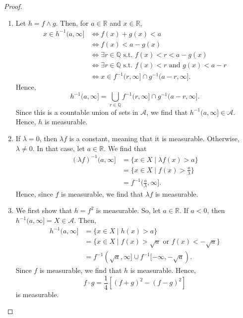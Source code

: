 \documentclass[a4paper, openany]{memoir}
\theoremstyle{definition}
\theoremstyle{plain}
\begin{document}
    \begin{proof}
        \hspace*{0pt}
        \begin{enumerate}
            \item Let $h = f \land g$. Then, for $a \in \mathbb{R}$ and $x \in \mathbb{R}$,
            \begin{align*}
                x \in h^{-1}(a, \infty] &\iff f(x) + g(x) < a \\
                &\iff f(x) < a - g(x) \\
                &\iff \exists r \in \mathbb{Q} \textrm{ s.t. } f(x) < r < a - g(x) \\
                &\iff \exists r \in \mathbb{Q} \textrm{ s.t. } f(x) < r \textrm{ and } g(x) < a - r \\
                &\iff x \in f^{-1} (r, \infty] \cap g^{-1} (a - r, \infty].
            \end{align*}
            Hence,
            \[h^{-1}(a, \infty] = \bigcup_{r \in \mathbb{Q}} f^{-1} (r, \infty] \cap g^{-1} (a - r, \infty].\]
            Since this is a countable union of sets in $\mathcal{A}$, we find that $h^{-1}(a, \infty] \in \mathcal{A}$. Hence, $h$ is measurable.
            
            \item If $\lambda = 0$, then $\lambda f$ is a constant, meaning that it is measurable. Otherwise, $\lambda \neq 0$. In that case, let $a \in \mathbb{R}$. We find that
            \begin{align*}
                (\lambda f)^{-1} (a, \infty] &= \{x \in X \mid \lambda f(x) > a\} \\
                &= \{x \in X \mid f(x) > \tfrac{a}{\lambda}\} \\
                &= f^{-1} (\tfrac{a}{\lambda}, \infty].
            \end{align*}
            Hence, since $f$ is measurable, we find that $\lambda f$ is measurable.

            \item We first show that $h = f^2$ is measurable. So, let $a \in \mathbb{R}$. If $a < 0$, then $h^{-1}(a, \infty] = X \in \mathcal{A}$. Then,
            \begin{align*}
                h^{-1}(a, \infty] &= \{x \in X \mid h(x) > a\} \\
                &= \{x \in X \mid f(x) > \sqrt{a} \textrm{ or } f(x) < -\sqrt{a}\} \\
                &= f^{-1}(\sqrt{a}, \infty] \cup f^{-1} [-\infty, -\sqrt{a}).
            \end{align*}
            Since $f$ is measurable, we find that $h$ is measurable. Hence,
            \[f \cdot g = \frac{1}{4} [(f + g)^2 - (f - g)^2]\]
            is measurable.
            

\end{enumerate}
\end{proof}
\end{document}
